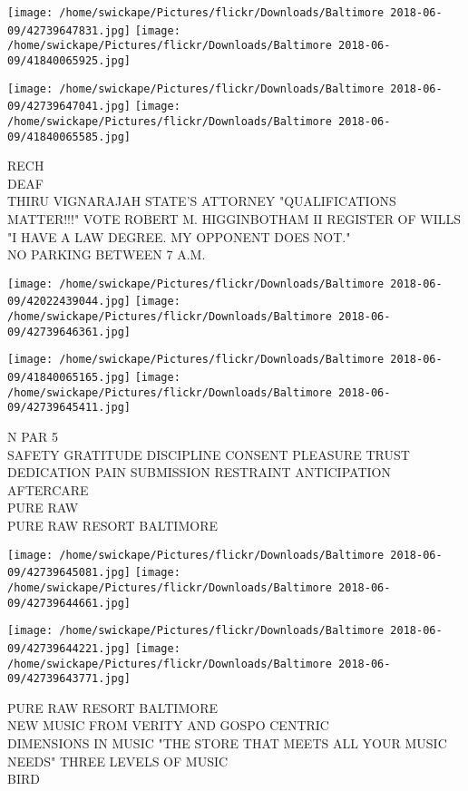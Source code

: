 \documentclass[10pt,letterpaper]{article}
\begin{document}
\texttt{[image: /home/swickape/Pictures/flickr/Downloads/Baltimore 2018-06-09/42739647831.jpg]}
\texttt{[image: /home/swickape/Pictures/flickr/Downloads/Baltimore 2018-06-09/41840065925.jpg]}

\texttt{[image: /home/swickape/Pictures/flickr/Downloads/Baltimore 2018-06-09/42739647041.jpg]}
\texttt{[image: /home/swickape/Pictures/flickr/Downloads/Baltimore 2018-06-09/41840065585.jpg]}

RECH\\
DEAF\\
THIRU VIGNARAJAH STATE'S ATTORNEY "QUALIFICATIONS MATTER!!!" VOTE ROBERT M. HIGGINBOTHAM II REGISTER OF WILLS "I HAVE A LAW DEGREE.  MY OPPONENT DOES NOT."\\
NO PARKING BETWEEN 7 A.M.\\
\pagebreak

\texttt{[image: /home/swickape/Pictures/flickr/Downloads/Baltimore 2018-06-09/42022439044.jpg]}
\texttt{[image: /home/swickape/Pictures/flickr/Downloads/Baltimore 2018-06-09/42739646361.jpg]}

\texttt{[image: /home/swickape/Pictures/flickr/Downloads/Baltimore 2018-06-09/41840065165.jpg]}
\texttt{[image: /home/swickape/Pictures/flickr/Downloads/Baltimore 2018-06-09/42739645411.jpg]}

N PAR 5\\
SAFETY GRATITUDE DISCIPLINE CONSENT PLEASURE TRUST DEDICATION PAIN SUBMISSION RESTRAINT ANTICIPATION AFTERCARE\\
PURE RAW\\
PURE RAW RESORT BALTIMORE\\
\pagebreak

\texttt{[image: /home/swickape/Pictures/flickr/Downloads/Baltimore 2018-06-09/42739645081.jpg]}
\texttt{[image: /home/swickape/Pictures/flickr/Downloads/Baltimore 2018-06-09/42739644661.jpg]}

\texttt{[image: /home/swickape/Pictures/flickr/Downloads/Baltimore 2018-06-09/42739644221.jpg]}
\texttt{[image: /home/swickape/Pictures/flickr/Downloads/Baltimore 2018-06-09/42739643771.jpg]}

PURE RAW RESORT BALTIMORE\\
NEW MUSIC FROM VERITY AND GOSPO CENTRIC\\
DIMENSIONS IN MUSIC "THE STORE THAT MEETS ALL YOUR MUSIC NEEDS" THREE LEVELS OF MUSIC\\
BIRD\\
\pagebreak
\end{document}
